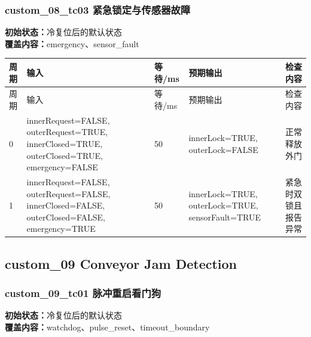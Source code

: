 \subsubsection{{\ttfamily custom\_08\_tc03} 紧急锁定与传感器故障}

\noindent\textbf{初始状态：}冷复位后的默认状态\\

\textbf{覆盖内容：}emergency、sensor\_fault

\begin{longtable}{L{1.0cm}L{4.7cm}L{1.4cm}L{4.0cm}L{2.1cm}}

\toprule

周期 & 输入 & 等待/ms & 预期输出 & 检查内容\\

\midrule

\endfirsthead

\toprule

周期 & 输入 & 等待/ms & 预期输出 & 检查内容\\

\midrule

\endhead

0 & innerRequest=FALSE, outerRequest=TRUE, innerClosed=TRUE, outerClosed=TRUE, emergency=FALSE & 50 & innerLock=TRUE, outerLock=FALSE & 正常释放外门\\

1 & innerRequest=FALSE, outerRequest=FALSE, innerClosed=FALSE, outerClosed=FALSE, emergency=TRUE & 50 & innerLock=TRUE, outerLock=TRUE, sensorFault=TRUE & 紧急时双锁且报告异常\\

\bottomrule

\end{longtable}

\subsection{{\ttfamily custom\_09} Conveyor Jam Detection}

\subsubsection{{\ttfamily custom\_09\_tc01} 脉冲重启看门狗}

\noindent\textbf{初始状态：}冷复位后的默认状态\\

\textbf{覆盖内容：}watchdog、pulse\_reset、timeout\_boundary

